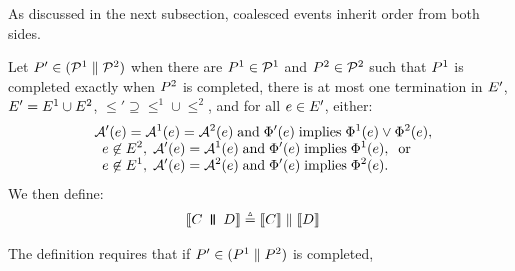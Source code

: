 As discussed in the next subsection, coalesced events inherit order from both sides.
\begin{definition}
  \label{def:par}
  Let $P' \in (\mathcal{P}^1 \parallel \mathcal{P}^2)$
  when there are $P^1 \in \mathcal{P}^1$ and $P^2 \in \mathcal{P}^2$
  such that
$P^1$ is completed exactly when $P^2$ is completed,
there is at most one termination in $E'$,
$E' = E^1 \cup E^2$,
${\le'}\supseteq{\le^1}\cup{\le^2}$,
and for all $e\in E'$,
either:
\begin{gather*}
  \begin{aligned}
    \;\;&\mathcal{A}'(e) = \mathcal{A}^1(e) = \mathcal{A}^2(e) \;\allowbreak\text{and}\allowbreak\; \Phi'(e) \; \allowbreak\text{implies}\allowbreak\; \Phi^1(e) \lor \Phi^2(e),\\[-1ex]
    &\;\;e \not\in E^2,\; \mathcal{A}'(e) = \mathcal{A}^1(e) \;\allowbreak\text{and}\allowbreak\; \Phi'(e) \; \allowbreak\text{implies}\allowbreak\; \Phi^1(e),\; \; \allowbreak\text{or}\allowbreak\;\\[-1ex]
    &\;\;e \not\in E^1,\; \mathcal{A}'(e) = \mathcal{A}^2(e) \;\allowbreak\text{and}\allowbreak\; \Phi'(e) \; \allowbreak\text{implies}\allowbreak\; \Phi^2(e).
  \end{aligned}
\end{gather*}
  We then define:
\begin{align*}
  \sem[\aThrd]{\aCmd \PAR[\bThrd][\bThrd'] \bCmd} & \eqdef
  \sem[\bThrd]{\aCmd} \parallel \sem[\bThrd']{\bCmd} 
\end{align*}
\end{definition}
The definition requires that if $P'\in(P^1 \parallel P^2)$ is completed,
